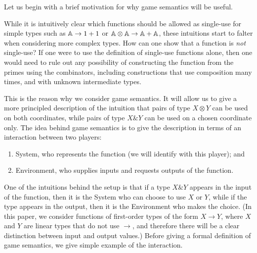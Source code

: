\documentclass[a4paper,UKenglish,cleveref, autoref, numberwithinsect, thm-restate]{lipics-v2021}
\begin{document}
Let us begin with a brief motivation for why game semantics will be useful.

While it is intuitively clear which functions should be allowed as single-use for simple types such as $\mathbb A \to 1+1$ or $\mathbb A \otimes \mathbb A \to \mathbb A + \mathbb A$, these intuitions start to falter when considering more complex types. How can one show that a function is \emph{not} single-use? If one were to use the definition of single-use functions alone, then one would need to rule out any possibility of constructing the function from the primes using the combinators, including constructions that use composition many times, and with unknown intermediate types. 

This is the reason why we consider game semantics. It will allow us to give  a more principled description of the intuition that pairs of type $X \otimes Y$ can be used on both coordinates, while pairs of type $X \& Y$ can be used on a chosen coordinate only. The idea behind game semantics is to give the description in terms of an interaction between two players:
\begin{enumerate}
    \item System, who represents the function (we will identify with this player); and
    \item Environment, who supplies inputs and requests outputs of the function.
\end{enumerate}
One of the intuitions behind the setup is that if a type $X \& Y$ appears in the input of the function, then it is the System who can choose to use $X$ or $Y$, while if the type appears in the output, then it is the Environment who makes the choice. (In this paper, we consider functions of first-order types of the form $X \to Y$, where $X$ and $Y$ are linear types that do not use $\to$, and therefore there will be a clear distinction between input and output values.)
Before giving a formal definition of game semantics, we give simple example of the interaction.
\end{document}
